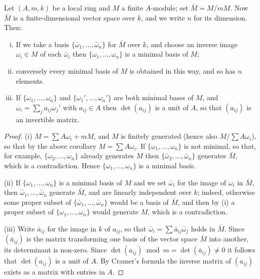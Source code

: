 \begin{theorem}\label{thm:2.3}
Let $(A, m, k)$ be a local ring and $M$ a finite $A$-module; set
$\bar{M} = M/mM$. Now $\bar{M}$ is a finite-dimensional vector space over $k$, and we
write $n$ for its dimension. Then:
\begin{enumerate}[(i)]
  \item If we take a basis $\{\bar{\omega}_1, \ldots, \bar{\omega}_n\}$ for $\bar{M}$ over $k$, and choose an
        inverse image $\omega_i \in M$ of each $\bar{\omega}_i$ then $\{\omega_1, \ldots, \omega_n\}$ is a minimal basis
        of $M$;
  \item conversely every minimal basis of $M$ is obtained in this way, and
        so has $n$ elements.
  \item If $\{\omega_1, \ldots, \omega_n\}$ and $\{\omega_1', \ldots, \omega_n'\}$ are both minimal bases of $M$, and
        $\omega_i = \sum_j a_{ij}\omega_j'$ with $a_{ij} \in A$ then $\det(a_{ij})$ is a unit of $A$, so that $(a_{ij})$ is an
        invertible matrix.
\end{enumerate}
\end{theorem}

\begin{proof}
(i) $M = \sum A\omega_i + mM$, and $M$ is finitely generated (hence also
$M/\sum A\omega_i$), so that by the above corollary $M = \sum A\omega_i$. If $\{\omega_1, \ldots, \omega_n\}$ is
not minimal, so that, for example, $\{\omega_2, \ldots, \omega_n\}$ already generates $M$ then
$\{\bar{\omega}_2, \ldots, \bar{\omega}_n\}$ generates $\bar{M}$, which is a contradiction. Hence $\{\omega_1, \ldots, \omega_n\}$
is a minimal basis.

(ii) If $\{\omega_1, \ldots, \omega_n\}$ is a minimal basis of $M$ and we set $\bar{\omega}_i$ for the image
of $\omega_i$ in $\bar{M}$, then $\bar{\omega}_1, \ldots, \bar{\omega}_n$ generate $\bar{M}$, and are linearly independent
over $k$; indeed, otherwise some proper subset of $\{\bar{\omega}_1, \ldots, \bar{\omega}_n\}$ would be
a basis of $\bar{M}$, and then by (i) a proper subset of $\{\omega_1, \ldots, \omega_n\}$ would
generate $M$, which is a contradiction.

(iii) Write $\bar{a}_{ij}$ for the image in $k$ of $a_{ij}$, so that $\bar{\omega}_i = \sum \bar{a}_{ij}\bar{\omega}_j$ holds
in $\bar{M}$. Since $(\bar{a}_{ij})$ is the matrix transforming one basis of the vector space
$\bar{M}$ into another, its determinant is non-zero. Since $\det(a_{ij}) \bmod m =
\det(\bar{a}_{ij}) \neq 0$ it follows that $\det(a_{ij})$ is a unit of $A$. By Cramer's formula
the inverse matrix of $(a_{ij})$ exists as a matrix with entries in $A$.
\end{proof}


